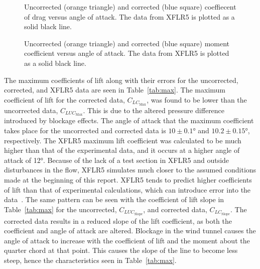 \documentclass[journal,letterpaper]{IEEEtran}
\begin{document}
\begin{figure}[H]
    \centering
    
    \caption{Uncorrected (orange triangle) and corrected (blue square) coeffiecent of drag versus angle of attack. The data from XFLR5 is plotted as a solid black line.}
    \label{fig:compdrag}
\end{figure}

\begin{figure}[H]
    \centering
    
    \caption{Uncorrected (orange triangle) and corrected (blue square) moment coefficient versus angle of attack. The data from XFLR5 is plotted as a solid black line.}
    \label{fig:compmoment}
\end{figure}

The maximum coefficients of lift along with their errors for the uncorrected, corrected, and XFLR5 data are seen in Table~\ref{tab:max}.
The maximum coefficient of lift for the corrected data, $C_{LC_\text{Max}}$, was found to be lower than the uncorrected data, $C_{LUC_\text{Max}}$.
This is due to the altered pressure difference introduced by blockage effects.
The angle of attack that the maximum coefficient takes place for the uncorrected and corrected data is $10 \pm \ang{0.1}$ and $10.2 \pm \ang{0.15}$, respectively.
The XFLR5 maximum lift coefficient was calculated to be much higher than that of the experimental data, and it occurs at a higher angle of attack of \ang{12}.
Because of the lack of a test section in XFLR5 and outside disturbances in the flow, XFLR5 simulates much closer to the assumed conditions made at the beginning of this report.
XFLR5 tends to predict higher coefficients of lift than that of experimental calculations, which can introduce error into the data~\cite{XFOIL}.
The same pattern can be seen with the coefficient of lift slope in Table~\ref{tab:max} for the uncorrected, $C_{LUC_\text{Slope}}$, and corrected data, $C_{LC_\text{Slope}}$.
The corrected data results in a reduced slope of the lift coefficient, as both the coefficient and angle of attack are altered.
Blockage in the wind tunnel causes the angle of attack to increase with the coefficient of lift and the moment about the quarter chord at that point.
This causes the slope of the line to become less steep, hence the characteristics seen in Table~\ref{tab:max}.
\end{document}
